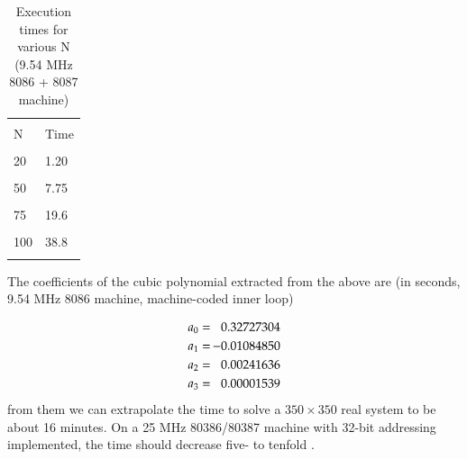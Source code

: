 \begin{table}
    \centering
    \caption{Execution times for various N (9.54 MHz 8086 + 8087 machine)}
        \bigskip
    \label{tbl:09_01} 
    \setlength{\tabcolsep}{40pt}
        \begin{tabular}{|ll|}
            \hline & \\
            N   &  Time\\
            & \\
            20  &  1.20\\
            & \\
            50  &  7.75\\
            & \\
            75  &  19.6\\
            & \\
            100 &  38.8\\
            & \\
            \hline
        \end{tabular}
\end{table}

The coefficients of the cubic polynomial extracted from the above
are (in seconds, 9.54 MHz 8086 machine, machine-coded inner loop)

\begin{equation*}
    \begin{split}
        a_0 &=\;\; 0.32727304\\
        a_1 &=\;\; \llap{$-$}0.01084850\\
        a_2 &=\;\; 0.00241636\\
        a_3 &=\;\; 0.00001539
    \end{split}
\end{equation*}
from them we can extrapolate the time to solve a $350 \times 350$ real system to be about 16 minutes. On a 25 MHz 80386/80387 machine with 32-bit addressing implemented, the time should decrease five- to tenfold .

